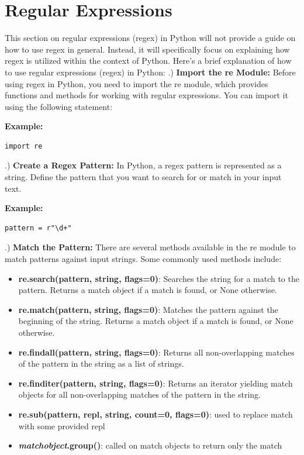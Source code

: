 \documentclass{report}
\begin{document}
    \pagebreak \bigbreak \noindent \section{Regular Expressions}
    \bigbreak \noindent 
    This section on regular expressions (regex) in Python will not provide a guide on how to use regex in general. Instead, it will specifically focus on explaining how regex is utilized within the context of Python.
    \bigbreak \noindent 
    Here's a brief explanation of how to use regular expressions (regex) in Python:
    \bigbreak {}.) \textbf{Import the re Module:}
    \bigbreak \noindent 
    Before using regex in Python, you need to import the re module, which provides functions and methods for working with regular expressions.
    \bigbreak \noindent 
    You can import it using the following statement:
    \bigbreak \noindent 
    \begin{mdframed}
      \textbf{Example: }
      \begin{verbatim}
import re
      \end{verbatim}
    \end{mdframed}
    \bigbreak {}.) \textbf{Create a Regex Pattern:}
    \bigbreak \noindent 
    In Python, a regex pattern is represented as a string.
    Define the pattern that you want to search for or match in your input text.
    \bigbreak \noindent 
    \begin{mdframed}
      \textbf{Example: }
      \begin{verbatim}
pattern = r"\d+"
      \end{verbatim}
      
    \end{mdframed}
    \bigbreak {}.) \textbf{Match the Pattern:}
    \bigbreak \noindent 
    There are several methods available in the re module to match patterns against input strings. Some commonly used methods include:
    \begin{itemize}
        \item \textbf{re.search(pattern, string, flags=0)}: Searches the string for a match to the pattern. Returns a match object if a match is found, or None otherwise.
        \item \textbf{re.match(pattern, string, flags=0)}: Matches the pattern against the beginning of the string. Returns a match object if a match is found, or None otherwise.
        \item \textbf{re.findall(pattern, string, flags=0)}: Returns all non-overlapping matches of the pattern in the string as a list of strings.
        \item \textbf{re.finditer(pattern, string, flags=0)}: Returns an iterator yielding match objects for all non-overlapping matches of the pattern in the string.
        \item \textbf{re.sub(pattern, repl, string, count=0, flags=0)}: used to replace match with some provided repl
        \item \textbf{\textit{matchobject}.group()}: called on match objects to return only the match
    \end{itemize}
\end{document}
